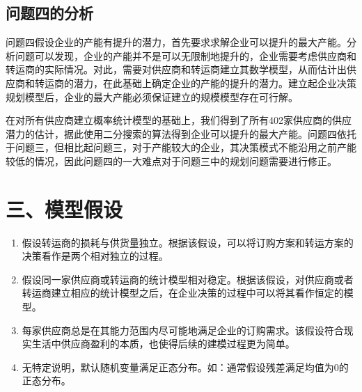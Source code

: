 \documentclass{my_paper}
\begin{document}
\subsection{问题四的分析}

问题四假设企业的产能有提升的潜力，首先要求求解企业可以提升的最大产能。分析问题可以发现，企业的产能并不是可以无限制地提升的，企业需要考虑供应商和转运商的实际情况。对此，需要对供应商和转运商建立其数学模型，从而估计出供应商和转运商的潜力，在此基础上确定企业的产能的提升的潜力。建立起企业决策规划模型后，企业的最大产能必须保证建立的规模模型存在可行解。

在对所有供应商建立概率统计模型的基础上，我们得到了所有402家供应商的供应潜力的估计，据此使用二分搜索的算法得到企业可以提升的最大产能。问题四依托于问题三，但相比起问题三，对于产能较大的企业，其决策模式不能沿用之前产能较低的情况，因此问题四的一大难点对于问题三中的规划问题需要进行修正。

\section{三、模型假设}

\iffalse
以下是6类常见的模型假设：
1.题目明确给出的假设条件
2.排除生活中的小概率事件(例如黑天鹅事件、非正常情况)
3.仅考虑问题中的核心因素，不考虑次要因素的影响
4.使用的模型中要求的假设
5.对模型中的参数形式(或者分布)进行假设
6.和题目联系很紧密的一些假设，主要是为了简化模型
\fi 

\begin{enumerate}

\item 假设转运商的损耗与供货量独立。根据该假设，可以将订购方案和转运方案的决策看作是两个相对独立的过程。
\item 假设同一家供应商或转运商的统计模型相对稳定。根据该假设，对供应商或者转运商建立相应的统计模型之后，在企业决策的过程中可以将其看作恒定的模型。
\item 每家供应商总是在其能力范围内尽可能地满足企业的订购需求。该假设符合现实生活中供应商盈利的本质，也使得后续的建模过程更为简单。
\item 无特定说明，默认随机变量满足正态分布。如：通常假设残差满足均值为0的正态分布。

\end{enumerate}

\newpage
\end{document}
